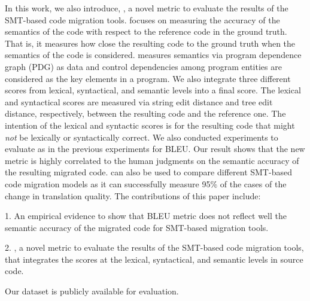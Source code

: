 In this work, we also introduce, {\model}, a novel metric to evaluate
the results of the SMT-based code migration tools. {\model} focuses on
measuring the accuracy of the semantics of the code with respect to
the reference code in the ground truth. That is, it measures how close
the resulting code to the ground truth when the semantics of the code
is considered. {\model} measures semantics via program dependence
graph (PDG) as data and control dependencies among program entities
are considered as the key elements in a program. We also integrate
three different scores from lexical, syntactical, and semantic levels
into a final {\model} score. The lexical and syntactical scores are
measured via string edit distance and tree edit distance,
respectively, between the resulting code and the reference one. The
intention of the lexical and syntactic scores is for the resulting
code that might {\em not} be lexically or syntactically correct. We
also conducted experiments to evaluate {\model} as in the previous
experiments for BLEU. Our result shows that the new metric {\model} is
highly correlated to the human judgments on the semantic accuracy of
the resulting migrated code. {\model} can also be used to compare
different SMT-based code migration models as it can successfully
measure 95\% of the cases of the change in translation quality. The
contributions of this paper include:

1. An empirical evidence to show that BLEU metric does not reflect
well the semantic accuracy of the migrated code for SMT-based
migration tools.

2. {\model}, a novel metric to evaluate the results of the SMT-based
code migration tools, that integrates the scores at the lexical,
syntactical, and semantic levels in source code.

Our dataset is publicly available for evaluation.





